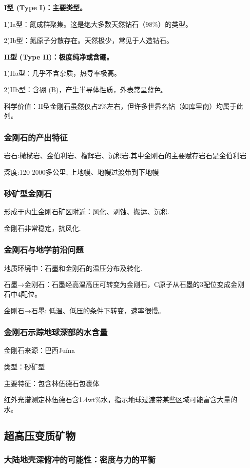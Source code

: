 \documentclass[12pt,a4paper]{article}
\begin{document}
	\textbf{I型 (Type I)：主要类型。}
	
	1)Ia型：氮成群聚集。这是绝大多数天然钻石（98\%）的类型。
	
	2)Ib型：氮原子分散存在。天然极少，常见于人造钻石。
	
	\textbf{II型 (Type II)：极度纯净或含硼。}
	
	1)IIa型：几乎不含杂质，热导率极高。
	
	2)IIb型：含硼 (B)，产生半导体性质，外表常呈蓝色。
	
	科学价值：II型金刚石虽然仅占2\%左右，但许多世界名钻（如库里南）均属于此列。
	
	\subsubsection{金刚石的产出特征}
	岩石:橄榄岩、金伯利岩、榴辉岩、沉积岩.其中金刚石的主要赋存岩石是金伯利岩
	
	深度:120-2000多公里, 上地幔、地幔过渡带到下地幔
	
	\subsubsection{砂矿型金刚石}
	形成于内生金刚石矿区附近：风化、剥蚀、搬运、沉积. 
	
	金刚石非常稳定，抗风化.
	
	\subsubsection{金刚石与地学前沿问题}
	地质环境中：石墨和金刚石的温压分布及转化.
	
	石墨→金刚石：石墨经高温高压可转变为金刚石，C原子从石墨的3配位变成金刚石中4配位。
	
	金刚石→石墨: 低温、低压的条件下转变，速率很慢。
	\subsubsection{金刚石示踪地球深部的水含量}
	金刚石来源：巴西Juína
	
	类型：砂矿型
	
	主要特征：包含林伍德石包裹体
	
	红外光谱测定林伍德石含1.4wt\%水，指示地球过渡带某些区域可能富含大量的水。
	
	\subsection{超高压变质矿物}
	\subsubsection{大陆地壳深俯冲的可能性：密度与力的平衡}
	
\end{document}
